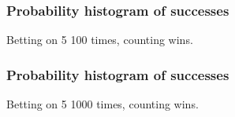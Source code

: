 \documentclass[handout]{beamer}
\begin{document}


   \begin{frame}
   \frametitle{Probability histogram of successes}
   \begin{center}
   \end{center}
   Betting on {\color{red} 5} 100 times, counting wins.
   \end{frame}



   \begin{frame}
   \frametitle{Probability histogram of successes}
   \begin{center}
   \end{center}
   Betting on {\color{red} 5} 1000 times, counting wins.
   \end{frame}

\end{document}
